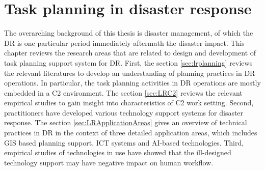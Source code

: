 \chapter{Task planning in disaster response}\label{ch:literatures}
The overarching background of this thesis is disaster management, of which the \acf{DR} is one particular period immediately aftermath the disaster impact. This chapter reviews the research areas that are related to design and development of task planning support system for \ac{DR}. First, the section \ref{sec:lrplanning} reviews the relevant literatures to develop an understanding of planning practices in DR operations. In particular, the task planning activities in \ac{DR} operations are mostly embedded in a \acf{C2} environment. The section \ref{sec:LRC2} reviews the relevant empirical studies to gain insight into characteristics of \ac{C2} work setting. Second, practitioners have developed various technology support systems for disaster response. The section \ref{sec:LRApplicationAreas} gives an overview of technical practices in \ac{DR} in the context of three detailed application areas, which includes \acf{GIS} based planning support, \acf{ICT} systems and AI-based technologies. Third, empirical studies of technologies in use have showed that the ill-designed technology support may have negative impact on human workflow. \\


